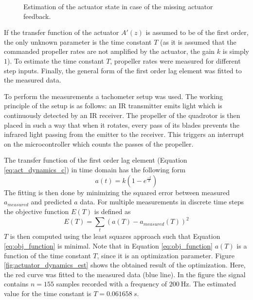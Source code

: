 \documentclass[11pt, a4paper, twoside]{report}
\begin{document}
\begin{figure}[H]
	\centering 
	\captionsetup{justification=centering, singlelinecheck=off, font=bf, belowskip=-0.5cm}
	\caption[Estimation of the actuator state in case of the missing actuator feedback]{Estimation of the actuator state in case of the missing actuator feedback.}
	\label{fig:actuator}
\end{figure}

If the transfer function of the actuator $A'(z)$ is assumed to be of the first order, the only unknown parameter is the time constant $T$ (as it is assumed that the commanded propeller rates are not amplified by the actuator, the gain $k$ is simply $1$). To estimate the time constant $T$, propeller rates were measured for different step inputs. Finally, the general form of the first order lag element was fitted to the measured data. 

To perform the measurements a tachometer setup was used. The working principle of the setup is as follows: an \acrfull{IR} transmitter emits light which is continuously detected by an \acrshort{IR} receiver. The propeller of the quadrotor is then placed in such a way that when it rotates, every pass of its blades prevents the infrared light passing from the emitter to the receiver. This triggers an interrupt on the microcontroller which counts the passes of the propeller.

The transfer function of the first order lag element (Equation \ref{eq:act_dynamics_c}) in time domain has the following form 
\begin{equation}
	a(t) = 	k (1 - e^{\frac{-t}{T}})
	\label{eq:act_dynamics_time}
\end{equation}
The fitting is then done by minimizing the squared error between measured $a_{measured}$ and predicted $a$ data. For multiple measurements in discrete time steps the objective function $E(T)$ is defined as 
\begin{equation}
	E(T) = \sum_{t}^{} (a(T) - a_{measured}(T))^2
	\label{eq:obj_function}
\end{equation}
$T$ is then computed using the least squares approach such that Equation \ref{eq:obj_function} is minimal. Note that in Equation \ref{eq:obj_function} $a(T)$ is a function of the time constant $T$, since it is an optimization parameter. Figure \ref{fig:actuator_dynamics_est} shows the obtained result of the optimization. Here, the red curve was fitted to the measured data (blue line). In the figure the signal contains $n=155$ samples recorded with a frequency of $200~\si{\Hz}$. The estimated value for the time constant is $T = 0.061658 \ s$.
	
\end{document}
